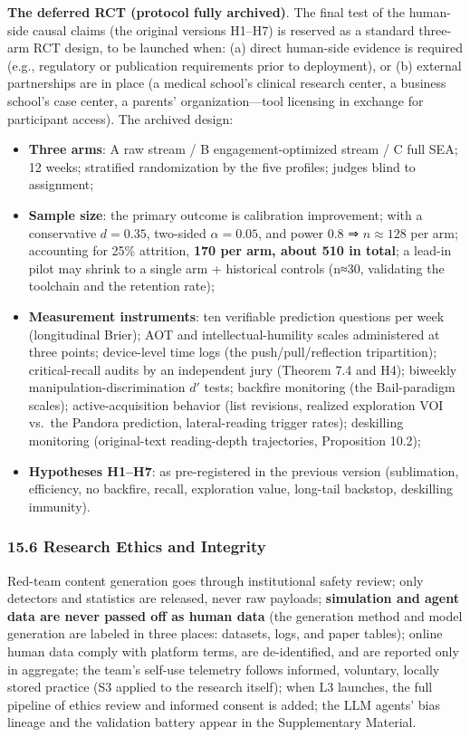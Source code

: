 \documentclass[
  11pt]{article}
\providecommand{\tightlist}{%
  \setlength{\itemsep}{0pt}\setlength{\parskip}{0pt}}
\begin{document}
\textbf{The deferred RCT (protocol fully archived)}. The final test of
the human-side causal claims (the original versions H1--H7) is reserved
as a standard three-arm RCT design, to be launched when: (a) direct
human-side evidence is required (e.g., regulatory or publication
requirements prior to deployment), or (b) external partnerships are in
place (a medical school's clinical research center, a business school's
case center, a parents' organization---tool licensing in exchange for
participant access). The archived design:

\begin{itemize}
\tightlist
\item
  \textbf{Three arms}: A raw stream / B engagement-optimized stream / C
  full SEA; 12 weeks; stratified randomization by the five profiles;
  judges blind to assignment;
\item
  \textbf{Sample size}: the primary outcome is calibration improvement;
  with a conservative \(d = 0.35\), two-sided \(\alpha = 0.05\), and
  power 0.8 ⇒ \(n \approx 128\) per arm; accounting for 25\% attrition,
  \textbf{170 per arm, about 510 in total}; a lead-in pilot may shrink
  to a single arm + historical controls (n≈30, validating the toolchain
  and the retention rate);
\item
  \textbf{Measurement instruments}: ten verifiable prediction questions
  per week (longitudinal Brier); AOT and intellectual-humility scales
  administered at three points; device-level time logs (the
  push/pull/reflection tripartition); critical-recall audits by an
  independent jury (Theorem 7.4 and H4); biweekly
  manipulation-discrimination \(d'\) tests; backfire monitoring (the
  Bail-paradigm scales); active-acquisition behavior (list revisions,
  realized exploration VOI vs.~the Pandora prediction, lateral-reading
  trigger rates); deskilling monitoring (original-text reading-depth
  trajectories, Proposition 10.2);
\item
  \textbf{Hypotheses H1--H7}: as pre-registered in the previous version
  (sublimation, efficiency, no backfire, recall, exploration value,
  long-tail backstop, deskilling immunity).
\end{itemize}

\subsubsection{15.6 Research Ethics and
Integrity}\label{research-ethics-and-integrity}

Red-team content generation goes through institutional safety review;
only detectors and statistics are released, never raw payloads;
\textbf{simulation and agent data are never passed off as human data}
(the generation method and model generation are labeled in three places:
datasets, logs, and paper tables); online human data comply with
platform terms, are de-identified, and are reported only in aggregate;
the team's self-use telemetry follows informed, voluntary, locally
stored practice (S3 applied to the research itself); when L3 launches,
the full pipeline of ethics review and informed consent is added; the
LLM agents' bias lineage and the validation battery appear in the
Supplementary Material.
\end{document}

